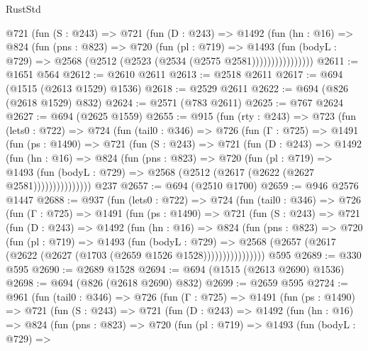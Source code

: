 \begin{lexlean}{RustStd}
\begin{coremodule}
              @721
                (fun (S : @243) =>
                @721
                  (fun (D : @243) =>
                  @1492
                    (fun (hn : @16) =>
                    @824
                      (fun (pns : @823) =>
                      @720
                        (fun (pl : @719) =>
                        @1493
                          (fun (bodyL : @729) =>
                          @2568 (@2512 (@2523 (@2534 (@2575 @2581))))))))))))))))
@2611 := @1651 @564
@2612 := @2610 @2611
@2613 := @2518 @2611
@2617 := @694 (@1515 (@2613 @1529) @1536)
@2618 := @2529 @2611
@2622 := @694 (@826 (@2618 @1529) @832)
@2624 := @2571 (@783 @2611)
@2625 := @767 @2624
@2627 := @694 (@2625 @1559)
@2655 := @915
    (fun (rty : @243) =>
    @723
      (fun (lets0 : @722) =>
      @724
        (fun (tail0 : @346) =>
        @726
          (fun (Γ : @725) =>
          @1491
            (fun (ps : @1490) =>
            @721
              (fun (S : @243) =>
              @721
                (fun (D : @243) =>
                @1492
                  (fun (hn : @16) =>
                  @824
                    (fun (pns : @823) =>
                    @720
                      (fun (pl : @719) =>
                      @1493
                        (fun (bodyL : @729) =>
                        @2568 (@2512 (@2617 (@2622 (@2627 @2581)))))))))))))))
    @237
@2657 := @694 (@2510 @1700)
@2659 := @946 @2576 @1447
@2688 := @937
    (fun (lets0 : @722) =>
    @724
      (fun (tail0 : @346) =>
      @726
        (fun (Γ : @725) =>
        @1491
          (fun (ps : @1490) =>
          @721
            (fun (S : @243) =>
            @721
              (fun (D : @243) =>
              @1492
                (fun (hn : @16) =>
                @824
                  (fun (pns : @823) =>
                  @720
                    (fun (pl : @719) =>
                    @1493
                      (fun (bodyL : @729) =>
                      @2568 (@2657 (@2617 (@2622 (@2627 (@1703 (@2659 @1526 @1528))))))))))))))))
    @595
@2689 := @330 @595
@2690 := @2689 @1528
@2694 := @694 (@1515 (@2613 @2690) @1536)
@2698 := @694 (@826 (@2618 @2690) @832)
@2699 := @2659 @595
@2724 := @961
    (fun (tail0 : @346) =>
    @726
      (fun (Γ : @725) =>
      @1491
        (fun (ps : @1490) =>
        @721
          (fun (S : @243) =>
          @721
            (fun (D : @243) =>
            @1492
              (fun (hn : @16) =>
              @824
                (fun (pns : @823) =>
                @720
                  (fun (pl : @719) =>
                  @1493
                    (fun (bodyL : @729) =>

\end{coremodule}
\end{lexlean}
